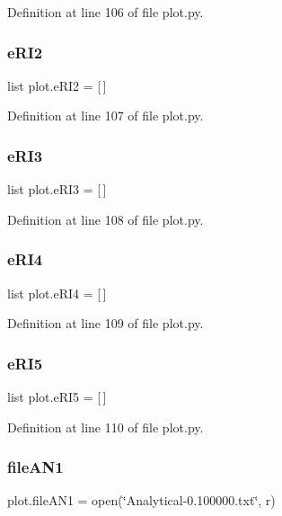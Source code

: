 Definition at line 106 of file plot.\+py.

\mbox{\label{namespaceplot_a6b2e57ebb5e524e6261b5823ffc7f08d}} 
\subsubsection{e\+R\+I2}
{\footnotesize\ttfamily list plot.\+e\+R\+I2 = [$\,$]}



Definition at line 107 of file plot.\+py.

\mbox{\label{namespaceplot_a31fa864dd5a3e46e8796ef0688a39f53}} 
\subsubsection{e\+R\+I3}
{\footnotesize\ttfamily list plot.\+e\+R\+I3 = [$\,$]}



Definition at line 108 of file plot.\+py.

\mbox{\label{namespaceplot_a074d07aec0a381fb9f98e74b02e6d199}} 
\subsubsection{e\+R\+I4}
{\footnotesize\ttfamily list plot.\+e\+R\+I4 = [$\,$]}



Definition at line 109 of file plot.\+py.

\mbox{\label{namespaceplot_a5c8c808d8a390420f43c9ed44c6aa45d}} 
\subsubsection{e\+R\+I5}
{\footnotesize\ttfamily list plot.\+e\+R\+I5 = [$\,$]}



Definition at line 110 of file plot.\+py.

\mbox{\label{namespaceplot_ab217464d724d6f0846a993071092dd52}} 
\subsubsection{file\+A\+N1}
{\footnotesize\ttfamily plot.\+file\+A\+N1 = open(\char`\"{}Analytical-\/0.\+100000.txt\char`\"{}, \textquotesingle{}r\textquotesingle{})}



